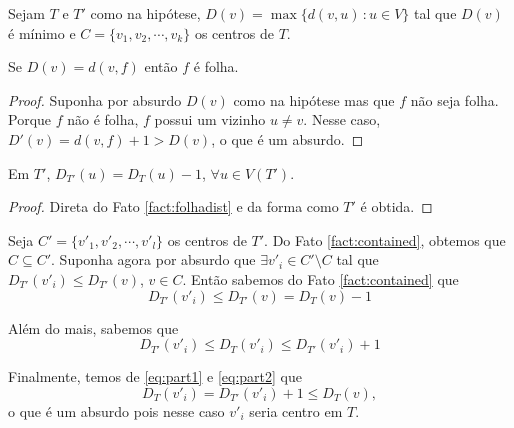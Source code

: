
 Sejam $T$ e $T'$ como na hipótese, $D(v) = \max\{d(v,u) \, : u \in V\}$
tal que $D(v)$ é mínimo e $C = \{v_1, v_2, \cdots, v_k\}$ os centros de $T$.

\begin{fact}
\label{fact:folhadist}
Se $D(v) = d(v, f)$ então $f$ é folha.
\end{fact}

\begin{proof} Suponha por absurdo $D(v)$ como na hipótese mas que $f$ não seja
folha. Porque $f$ não é folha, $f$ possui um vizinho $u \ne v$. Nesse caso,
$D'(v) = d(v, f) + 1 > D(v)$, o que é um absurdo.
\end{proof}

\begin{fact}
\label{fact:contained}
Em $T'$, $D_{T'}(u) = D_T(u) - 1$, $\forall u \in V(T')$.
\end{fact}

\begin{proof} Direta do Fato \ref{fact:folhadist} e da forma como $T'$ é obtida.
\end{proof}

Seja $C' = \{v'_1, v'_2, \cdots, v'_l\}$ os centros de $T'$. Do Fato
\ref{fact:contained}, obtemos que $C \subseteq C'$. Suponha agora por absurdo que
$\exists v'_i \in C' \setminus C$ tal que $D_{T'}(v'_i) \le D_{T'}(v)$, $v \in C$.
Então sabemos do Fato \ref{fact:contained} que
\begin{equation}
\label{eq:part1}
D_{T'}(v'_i) \le D_{T'}(v) = D_T(v) - 1
\end{equation}

Além do mais, sabemos que
\begin{equation}
\label{eq:part2}
D_{T'}(v'_i) \le D_T(v'_i) \le D_{T'}(v'_i) + 1
\end{equation}

Finalmente, temos de \eqref{eq:part1} e \eqref{eq:part2} que
\[D_T(v'_i) = D_{T'}(v'_i) + 1 \le D_T(v),\] o que é um absurdo pois nesse caso
$v'_i$ seria centro em $T$.


